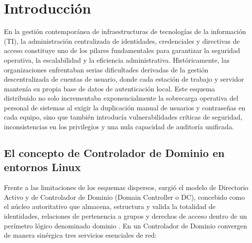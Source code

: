
\section{Introducción}

En la gestión contemporánea de infraestructuras de tecnologías de la información (TI), la administración centralizada de identidades, credenciales y directivas de acceso constituye uno de los pilares fundamentales para garantizar la seguridad operativa, la escalabilidad y la eficiencia administrativa. Históricamente, las organizaciones enfrentaban serias dificultades derivadas de la gestión descentralizada de cuentas de usuario, donde cada estación de trabajo y servidor mantenía su propia base de datos de autenticación local. Este esquema distribuido no solo incrementaba exponencialmente la sobrecarga operativa del personal de sistemas al exigir la duplicación manual de usuarios y contraseñas en cada equipo, sino que también introducía vulnerabilidades críticas de seguridad, inconsistencias en los privilegios y una nula capacidad de auditoría unificada.

\subsection{El concepto de Controlador de Dominio en entornos Linux}

Frente a las limitaciones de los esquemas dispersos, surgió el modelo de Directorio Activo y de Controlador de Dominio (Domain Controller o DC), concebido como el núcleo autoritativo que almacena, estructura y valida la totalidad de identidades, relaciones de pertenencia a grupos y derechos de acceso dentro de un perímetro lógico denominado dominio \citep{msft_activedirectory}. En un Controlador de Dominio convergen de manera sinérgica tres servicios esenciales de red:

